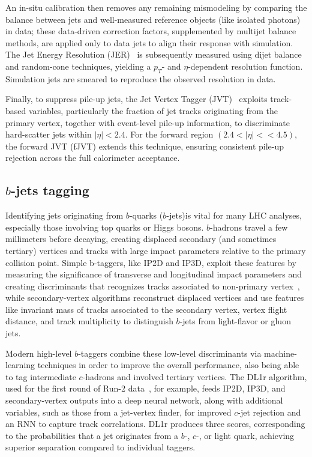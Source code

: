 An in-situ calibration then removes any remaining mismodeling by comparing the balance between jets and well-measured reference objects (like isolated photons) in data; these data-driven correction factors, supplemented by multijet balance methods, are applied only to data jets to align their response with simulation. The Jet Energy Resolution (JER)~\cite{Aaboud_2017} is subsequently measured using dijet balance and random-cone techniques, yielding a $p_{T}$- and $\eta$-dependent resolution function. Simulation jets are smeared to reproduce the observed resolution in data.

Finally, to suppress pile-up jets, the Jet Vertex Tagger (JVT)~\cite{ATL-PHYS-PUB-2014-001} exploits track-based variables, particularly the fraction of jet tracks originating from the primary vertex, together with event-level pile-up information, to discriminate hard-scatter jets within $|\eta|<2.4$. For the forward region $(2.4<|\eta|<<4.5)$, the forward JVT (fJVT) extends this technique, ensuring consistent pile-up rejection across the full calorimeter acceptance. 

\subsection*{$b$-jets tagging} 

Identifying jets originating from $b$-quarks ($b$-jets)is vital for many LHC analyses, especially those involving top quarks or Higgs bosons. $b$-hadrons travel a few millimeters before decaying, creating displaced secondary (and sometimes tertiary) vertices and tracks with large impact parameters relative to the primary collision point.
Simple b-taggers, like IP2D and IP3D, exploit these features by measuring the significance of transverse and longitudinal impact parameters and creating discriminants that recognizes tracks associated to non-primary vertex~\cite{btag_1,btag_2}, while secondary-vertex algorithms reconstruct displaced vertices and use features like invariant mass of tracks associated to the secondary vertex, vertex flight distance, and track multiplicity to distinguish $b$-jets from light-flavor or gluon jets.

Modern high-level $b$-taggers combine these low-level discriminants via machine-learning techniques in order to improve the overall performance, also being able to tag intermediate $c$-hadrons and involved tertiary vertices. The DL1r algorithm, used for the first round of Run-2 data~\cite{tagging}, for example, feeds IP2D, IP3D, and secondary-vertex outputs into a deep neural network, along with additional variables, such as those from a jet-vertex finder, for improved $c$-jet rejection and an RNN to capture track correlations. DL1r produces three scores, corresponding to the probabilities that a jet originates from a $b$-, $c$-, or light quark, achieving superior separation compared to individual taggers.

